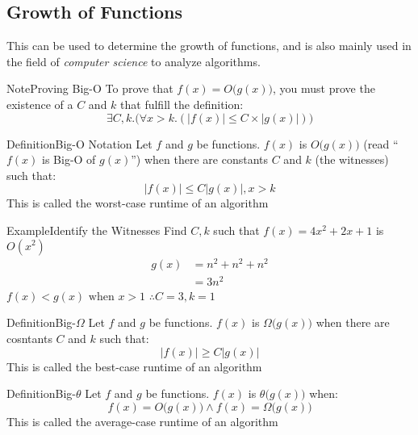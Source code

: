 \documentclass{MathNotes}
\newenvironment{example}[1]{\begin{BlueBox}{Example}{#1}}{\end{BlueBox}}
\newenvironment{definition}[1]{\begin{RedBox}{Definition}{#1}}{\end{RedBox}}
\newenvironment{note}[1]{\begin{YellowBox}{Note}{#1}}{\end{YellowBox}}
\begin{document}
\newpage
\subsection{Growth of Functions}
This can be used to determine the growth of functions, and is also mainly
used in the field of \textit{computer science} to analyze algorithms.

\begin{multicols}{2}
	\begin{note}{Proving Big-O}\label{note:proving-big-o}
		To prove that $f(x)=O\big(g(x)\big)$, you must prove the existence of a $C$ and $k$ that fulfill the definition:\[\exists C,k.\big(\forall x>k.(|f(x)|\leq C\times |g(x)|)\big)\]
	\end{note}
	\begin{definition}{Big-O Notation}\label{def:big-o-notation}
		Let $f$ and $g$ be functions. $f(x)$ is $O\big(g(x)\big)$ (read ``$f(x)$ is Big-O of $g(x)$'') when there are constants $C$ and $k$ (the witnesses) such that:\[|f(x)|\leq C|g(x)|,x>k\] This is called the worst-case runtime of an algorithm
	\end{definition}
\end{multicols}

\begin{example}{Identify the Witnesses}\label{ex:find-witnesses}
Find $C,k$ such that $f(x)=4x^2+2x+1$ is $O(x^2)$
\begin{align*}
g(x) &= n^2+n^2+n^2\\
 &= 3n^2
\end{align*}
$f(x)<g(x) \text{ when } x>1$
\centering $\displaystyle\therefore C=3,k=1$
\end{example}

\begin{multicols}{2}
\begin{definition}{Big-$\Omega$}\label{def:big-omega}
	Let $f$ and $g$ be functions. $f(x)$ is $\Omega\big(g(x)\big)$ when there are
	cosntants $C$ and $k$ such that:\[|f(x)|\geq C|g(x)|\] This is called the
	best-case runtime of an algorithm
\end{definition}
\begin{definition}{Big-$\theta$}\label{def:big-theta}
	Let $f$ and $g$ be functions. $f(x)$ is $\theta\big(g(x)\big)$ when:\[f(x)=O\big(g(x)\big)\land f(x)=\Omega\big(g(x)\big)\]
	This is called the average-case runtime of an algorithm
\end{definition}
\end{multicols}
\end{document}
